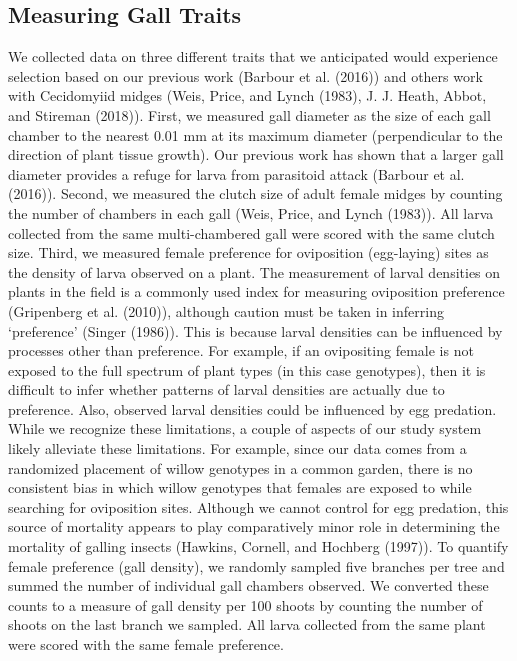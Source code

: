 \documentclass[]{elsarticle} %
\begin{document}
\subsection{Measuring Gall Traits}\label{measuring-gall-traits}

We collected data on three different traits that we anticipated would
experience selection based on our previous work (Barbour et al. (2016))
and others work with Cecidomyiid midges (Weis, Price, and Lynch (1983),
J. J. Heath, Abbot, and Stireman (2018)). First, we measured gall
diameter as the size of each gall chamber to the nearest 0.01 mm at its
maximum diameter (perpendicular to the direction of plant tissue
growth). Our previous work has shown that a larger gall diameter
provides a refuge for larva from parasitoid attack (Barbour et al.
(2016)). Second, we measured the clutch size of adult female midges by
counting the number of chambers in each gall (Weis, Price, and Lynch
(1983)). All larva collected from the same multi-chambered gall were
scored with the same clutch size. Third, we measured female preference
for oviposition (egg-laying) sites as the density of larva observed on a
plant. The measurement of larval densities on plants in the field is a
commonly used index for measuring oviposition preference (Gripenberg et
al. (2010)), although caution must be taken in inferring `preference'
(Singer (1986)). This is because larval densities can be influenced by
processes other than preference. For example, if an ovipositing female
is not exposed to the full spectrum of plant types (in this case
genotypes), then it is difficult to infer whether patterns of larval
densities are actually due to preference. Also, observed larval
densities could be influenced by egg predation.\\
While we recognize these limitations, a couple of aspects of our study
system likely alleviate these limitations. For example, since our data
comes from a randomized placement of willow genotypes in a common
garden, there is no consistent bias in which willow genotypes that
females are exposed to while searching for oviposition sites. Although
we cannot control for egg predation, this source of mortality appears to
play comparatively minor role in determining the mortality of galling
insects (Hawkins, Cornell, and Hochberg (1997)). To quantify female
preference (gall density), we randomly sampled five branches per tree
and summed the number of individual gall chambers observed. We converted
these counts to a measure of gall density per 100 shoots by counting the
number of shoots on the last branch we sampled. All larva collected from
the same plant were scored with the same female preference.
\end{document}
